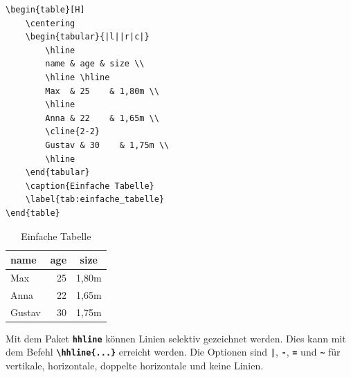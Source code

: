 \begin{minipage}{0.5\textwidth}
    \begin{lstlisting}[language={[LaTeX]TeX}]
\begin{table}[H]
    \centering
    \begin{tabular}{|l||r|c|}
        \hline
        name & age & size \\
        \hline \hline
        Max  & 25    & 1,80m \\
        \hline
        Anna & 22    & 1,65m \\
        \cline{2-2}
        Gustav & 30    & 1,75m \\
        \hline
    \end{tabular}
    \caption{Einfache Tabelle}
    \label{tab:einfache_tabelle}
\end{table}
\end{lstlisting}
\end{minipage}
\hfill
\begin{minipage}{0.5\textwidth}
    \begin{table}[H]
        \centering
        \begin{tabular}{|l||r|c|}
            \hline
            name   & age & size  \\
            \hline \hline
            Max    & 25  & 1,80m \\
            \hline
            Anna   & 22  & 1,65m \\
            \cline{2-2}
            Gustav & 30  & 1,75m \\
            \hline
        \end{tabular}
        \caption{Einfache Tabelle}
        \label{tab:einfache_tabelle}
    \end{table}
\end{minipage}

Mit dem Paket \textbf{\texttt{hhline}} können Linien selektiv gezeichnet werden. Dies kann mit dem Befehl \textbf{\texttt{\textbackslash hhline\{...\}}} erreicht werden.
Die Optionen sind \textbf{\texttt{|}}, \textbf{\texttt{-}}, \textbf{\texttt{=}} und \textbf{\texttt{\textasciitilde}} für vertikale, horizontale, doppelte horizontale und keine Linien.

